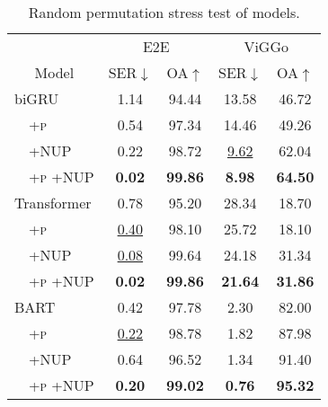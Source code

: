 \begin{table}

    \centering

    \begin{tabular}{llcccc}
\toprule
 & & \multicolumn{2}{c}{E2E} & \multicolumn{2}{c}{ViGGo} \\
\cmidrule(lr){3-4} \cmidrule(lr){5-6}
 \multicolumn{2}{c}{Model} & SER$\downarrow$ & OA$\uparrow$ & SER$\downarrow$ & OA$\uparrow$ \\
\midrule
\multicolumn{2}{l}{biGRU} &
 1.14 & 94.44 & 13.58 & 46.72 \\
 & \small{\textsc{+p }} &
 0.54 & 97.34 & 14.46 & 49.26 \\
 & \small{\textsc{+NUP }} &
 0.22 & 98.72 &  \uline{9.62} & 62.04 \\
 & \small{\textsc{+p +NUP }} &
\textbf{ 0.02} & \textbf{99.86} & \textbf{ 8.98} & \textbf{64.50} \\
\midrule
\multicolumn{2}{l}{Transformer} &
 0.78 & 95.20 & 28.34 & 18.70 \\
 & \small{\textsc{+p }} &
 \uline{0.40} & 98.10 & 25.72 & 18.10 \\
 & \small{\textsc{+NUP }} &
 \uline{0.08} & 99.64 & 24.18 & 31.34 \\
 & \small{\textsc{+p +NUP }} &
\textbf{ 0.02} & \textbf{99.86} & \textbf{21.64} & \textbf{31.86} \\
\midrule
\multicolumn{2}{l}{BART} &
 0.42 & 97.78 &  2.30 & 82.00 \\
 & \small{\textsc{+p }} &
\uline{0.22} & 98.78 &  1.82 & 87.98 \\
 & \small{\textsc{+NUP }} &
 0.64 & 96.52 &  1.34 & 91.40 \\
 & \small{\textsc{+p +NUP }} &
\textbf{ 0.20} & \textbf{99.02} & \textbf{ 0.76} & \textbf{95.32} \\
\bottomrule

    \end{tabular}

\caption{Random permutation stress test of  models.}
\label{tab:perm}
\end{table}
